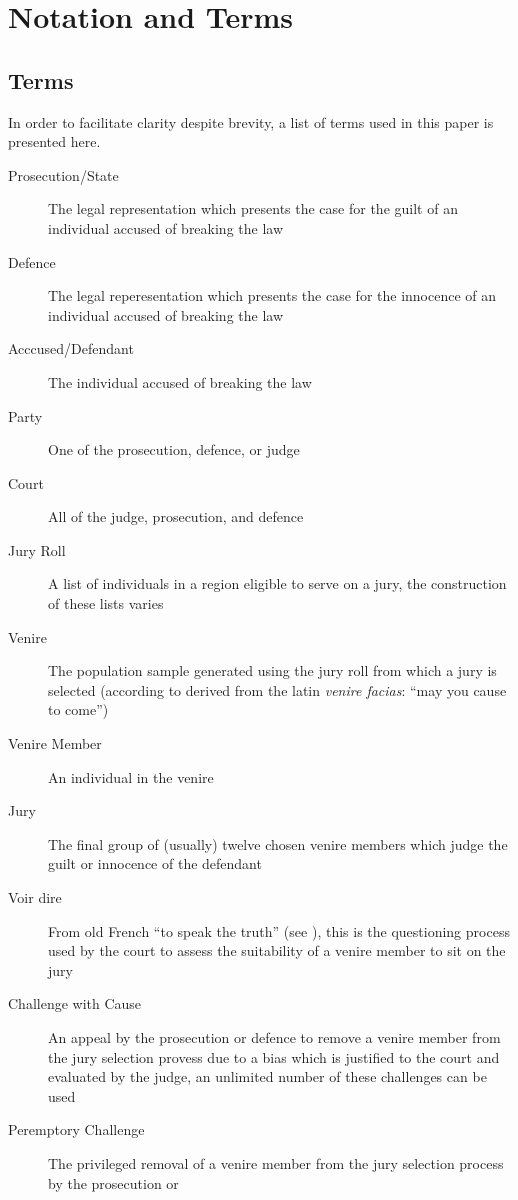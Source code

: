 \chapter*{Notation and Terms}
\label{c:Notation}

\section*{Terms}

In order to facilitate clarity despite brevity, a list of terms used in this paper is presented here.

\begin{description}
\item[Prosecution/State] The legal representation which presents the case for the guilt of an individual accused of breaking the law
\item[Defence] The legal reperesentation which presents the case for the innocence of an individual accused of breaking the law
\item[Acccused/Defendant] The individual accused of breaking the law
\item[Party] One of the prosecution, defence, or judge
\item[Court] All of the judge, prosecution, and defence
\item[Jury Roll] A list of individuals in a region eligible to serve on a jury, the construction of these lists varies
\item[Venire] The population sample generated using the jury roll from which a jury is selected (according to \cite{venireety}
  derived from the latin \textit{venire facias}: ``may you cause to come'')
\item[Venire Member] An individual in the venire
\item[Jury] The final group of (usually) twelve chosen venire members which judge the guilt or innocence of the
    defendant
\item[Voir dire] From old French ``to speak the truth'' (see \cite{voirety}), this is the questioning process used by the court to
  assess the suitability of a venire member to sit on the jury
\item[Challenge with Cause] An appeal by the prosecution or defence to remove a venire member from the jury selection provess due
  to a bias which is justified to the court and evaluated by the judge, an unlimited number of these challenges can be used
\item[Peremptory Challenge] The privileged removal of a venire member from the jury selection process by the prosecution or

\end{description}
